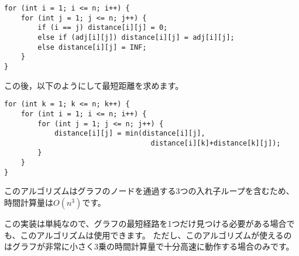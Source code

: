 \begin{lstlisting}
for (int i = 1; i <= n; i++) {
    for (int j = 1; j <= n; j++) {
        if (i == j) distance[i][j] = 0;
        else if (adj[i][j]) distance[i][j] = adj[i][j];
        else distance[i][j] = INF;
    }
}
\end{lstlisting}
この後，以下のようにして最短距離を求めます。
\begin{lstlisting}
for (int k = 1; k <= n; k++) {
    for (int i = 1; i <= n; i++) {
        for (int j = 1; j <= n; j++) {
            distance[i][j] = min(distance[i][j],
                                   distance[i][k]+distance[k][j]);
        }
    }
}
\end{lstlisting}


このアルゴリズムはグラフのノードを通過する3つの入れ子ループを含むため、時間計算量は$O(n^3)$です。

この実装は単純なので、グラフの最短経路を1つだけ見つける必要がある場合でも、このアルゴリズムは使用できます。
ただし、このアルゴリズムが使えるのはグラフが非常に小さく3乗の時間計算量で十分高速に動作する場合のみです。
